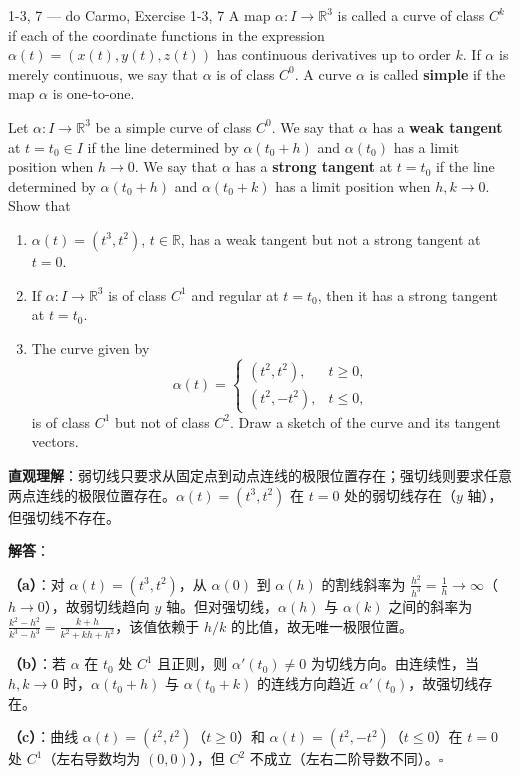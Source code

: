 \begin{exercise}{1-3, 7 — do Carmo, Exercise 1-3, 7}
A map $\alpha: I \to \mathbb{R}^3$ is called a curve of class $C^k$ if each of the coordinate functions in the expression $\alpha(t) = (x(t), y(t), z(t))$ has continuous derivatives up to order $k$. If $\alpha$ is merely continuous, we say that $\alpha$ is of class $C^0$. A curve $\alpha$ is called \textbf{simple} if the map $\alpha$ is one-to-one.

Let $\alpha: I \to \mathbb{R}^3$ be a simple curve of class $C^0$. We say that $\alpha$ has a \textbf{weak tangent} at $t = t_0 \in I$ if the line determined by $\alpha(t_0 + h)$ and $\alpha(t_0)$ has a limit position when $h \to 0$. We say that $\alpha$ has a \textbf{strong tangent} at $t = t_0$ if the line determined by $\alpha(t_0 + h)$ and $\alpha(t_0 + k)$ has a limit position when $h, k \to 0$. Show that
\begin{enumerate}
\item[a.] $\alpha(t) = (t^3, t^2)$, $t \in \mathbb{R}$, has a weak tangent but not a strong tangent at $t = 0$.
\item[b.] If $\alpha: I \to \mathbb{R}^3$ is of class $C^1$ and regular at $t = t_0$, then it has a strong tangent at $t = t_0$.
\item[c.] The curve given by
\[
\alpha(t) = \begin{cases} (t^2, t^2), & t \geq 0, \\ (t^2, -t^2), & t \leq 0, \end{cases}
\]
is of class $C^1$ but not of class $C^2$. Draw a sketch of the curve and its tangent vectors.
\end{enumerate}
\end{exercise}

\be
\begin{solution}
\textbf{直观理解}：弱切线只要求从固定点到动点连线的极限位置存在；强切线则要求任意两点连线的极限位置存在。$\alpha(t) = (t^3, t^2)$ 在 $t=0$ 处的弱切线存在（$y$ 轴），但强切线不存在。

\textbf{解答}：

\textbf{（a）}：对 $\alpha(t) = (t^3, t^2)$，从 $\alpha(0)$ 到 $\alpha(h)$ 的割线斜率为 $\frac{h^2}{h^3} = \frac{1}{h} \to \infty$（$h \to 0$），故弱切线趋向 $y$ 轴。但对强切线，$\alpha(h)$ 与 $\alpha(k)$ 之间的斜率为 $\frac{k^2 - h^2}{k^3 - h^3} = \frac{k+h}{k^2 + kh + h^2}$，该值依赖于 $h/k$ 的比值，故无唯一极限位置。

\textbf{（b）}：若 $\alpha$ 在 $t_0$ 处 $C^1$ 且正则，则 $\alpha'(t_0) \neq 0$ 为切线方向。由连续性，当 $h, k \to 0$ 时，$\alpha(t_0+h)$ 与 $\alpha(t_0+k)$ 的连线方向趋近 $\alpha'(t_0)$，故强切线存在。

\textbf{（c）}：曲线 $\alpha(t) = (t^2, t^2)$（$t \geq 0$）和 $\alpha(t) = (t^2, -t^2)$（$t \leq 0$）在 $t=0$ 处 $C^1$（左右导数均为 $(0,0)$），但 $C^2$ 不成立（左右二阶导数不同）。$\square$
\end{solution}

